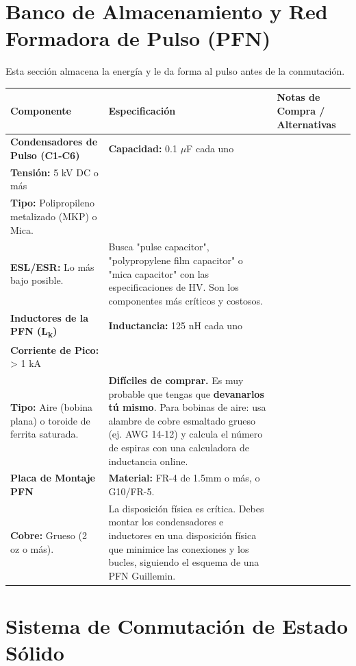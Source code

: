 \documentclass[11pt, a4paper]{article}
\begin{document}
\newpage
\section{Banco de Almacenamiento y Red Formadora de Pulso (PFN)}

Esta sección almacena la energía y le da forma al pulso antes de la conmutación.

\begin{longtable}{|p{3.5cm}|p{4.5cm}|p{6cm}|}
\hline
\rowcolor[gray]{0.9}
\textbf{Componente} & \textbf{Especificación} & \textbf{Notas de Compra / Alternativas} \\
\hline
\endhead

\textbf{Condensadores de Pulso (C1-C6)} & 
\textbf{Capacidad:} 0.1 $\mu$F cada uno \\
\textbf{Tensión:} 5 kV DC o más \\
\textbf{Tipo:} Polipropileno metalizado (MKP) o Mica. \\
\textbf{ESL/ESR:} Lo más bajo posible. & 
Busca "pulse capacitor", "polypropylene film capacitor" o "mica capacitor" con las especificaciones de HV. Son los componentes más críticos y costosos. \\
\hline

\textbf{Inductores de la PFN (L\textsubscript{k})} & 
\textbf{Inductancia:} 125 nH cada uno \\
\textbf{Corriente de Pico:} > 1 kA \\
\textbf{Tipo:} Aire (bobina plana) o toroide de ferrita saturada. & 
\textbf{Difíciles de comprar.} Es muy probable que tengas que \textbf{devanarlos tú mismo}. Para bobinas de aire: usa alambre de cobre esmaltado grueso (ej. AWG 14-12) y calcula el número de espiras con una calculadora de inductancia online. \\
\hline

\textbf{Placa de Montaje PFN} & 
\textbf{Material:} FR-4 de 1.5mm o más, o G10/FR-5. \\
\textbf{Cobre:} Grueso (2 oz o más). & 
La disposición física es crítica. Debes montar los condensadores e inductores en una disposición física que minimice las conexiones y los bucles, siguiendo el esquema de una PFN Guillemin. \\
\hline

\end{longtable}

\newpage
\section{Sistema de Conmutación de Estado Sólido}
\end{document}
